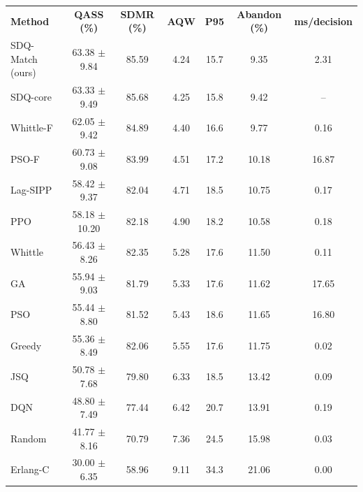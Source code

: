 \begin{tabular}{|l|c|c|c|c|c|c|}
\hline
\textbf{Method} & \textbf{QASS (\%)} & \textbf{SDMR (\%)} & \textbf{AQW} & \textbf{P95} & \textbf{Abandon (\%)} & \textbf{ms/decision} \\ \thickhline
SDQ-Match (ours) & 63.38 $\pm$ 9.84 & 85.59 & 4.24 & 15.7 & 9.35 & 2.31 \\ \hline
SDQ-core & 63.33 $\pm$ 9.49 & 85.68 & 4.25 & 15.8 & 9.42 & -- \\ \hline
Whittle-F & 62.05 $\pm$ 9.42 & 84.89 & 4.40 & 16.6 & 9.77 & 0.16 \\ \hline
PSO-F & 60.73 $\pm$ 9.08 & 83.99 & 4.51 & 17.2 & 10.18 & 16.87 \\ \hline
Lag-SIPP & 58.42 $\pm$ 9.37 & 82.04 & 4.71 & 18.5 & 10.75 & 0.17 \\ \hline
PPO & 58.18 $\pm$ 10.20 & 82.18 & 4.90 & 18.2 & 10.58 & 0.18 \\ \hline
Whittle & 56.43 $\pm$ 8.26 & 82.35 & 5.28 & 17.6 & 11.50 & 0.11 \\ \hline
GA & 55.94 $\pm$ 9.03 & 81.79 & 5.33 & 17.6 & 11.62 & 17.65 \\ \hline
PSO & 55.44 $\pm$ 8.80 & 81.52 & 5.43 & 18.6 & 11.65 & 16.80 \\ \hline
Greedy & 55.36 $\pm$ 8.49 & 82.06 & 5.55 & 17.6 & 11.75 & 0.02 \\ \hline
JSQ & 50.78 $\pm$ 7.68 & 79.80 & 6.33 & 18.5 & 13.42 & 0.09 \\ \hline
DQN & 48.80 $\pm$ 7.49 & 77.44 & 6.42 & 20.7 & 13.91 & 0.19 \\ \hline
Random & 41.77 $\pm$ 8.16 & 70.79 & 7.36 & 24.5 & 15.98 & 0.03 \\ \hline
Erlang-C & 30.00 $\pm$ 6.35 & 58.96 & 9.11 & 34.3 & 21.06 & 0.00 \\ \hline
\end{tabular}